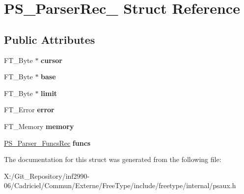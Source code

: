 \hypertarget{struct_p_s___parser_rec__}{\section{P\-S\-\_\-\-Parser\-Rec\-\_\- Struct Reference}
\label{struct_p_s___parser_rec__}
}
\subsection*{Public Attributes}
\begin{DoxyCompactItemize}
\item 
\hypertarget{struct_p_s___parser_rec___a6ed189bc25c03814bdafad63819ddfe7}{F\-T\-\_\-\-Byte $\ast$ {\bfseries cursor}}\label{struct_p_s___parser_rec___a6ed189bc25c03814bdafad63819ddfe7}

\item 
\hypertarget{struct_p_s___parser_rec___a30528f6a9caffce2fd44ef2d5a38e5bd}{F\-T\-\_\-\-Byte $\ast$ {\bfseries base}}\label{struct_p_s___parser_rec___a30528f6a9caffce2fd44ef2d5a38e5bd}

\item 
\hypertarget{struct_p_s___parser_rec___af3310795fd73530036fb32ec4385ea3d}{F\-T\-\_\-\-Byte $\ast$ {\bfseries limit}}\label{struct_p_s___parser_rec___af3310795fd73530036fb32ec4385ea3d}

\item 
\hypertarget{struct_p_s___parser_rec___a7a1432cb4d8bb603663f1258224c8ec4}{F\-T\-\_\-\-Error {\bfseries error}}\label{struct_p_s___parser_rec___a7a1432cb4d8bb603663f1258224c8ec4}

\item 
\hypertarget{struct_p_s___parser_rec___a3e2206deb6c0d73f51c8c71d5db1db1f}{F\-T\-\_\-\-Memory {\bfseries memory}}\label{struct_p_s___parser_rec___a3e2206deb6c0d73f51c8c71d5db1db1f}

\item 
\hypertarget{struct_p_s___parser_rec___a450031fd9e77e55bf424dc64a8d2659d}{\hyperlink{struct_p_s___parser___funcs_rec__}{P\-S\-\_\-\-Parser\-\_\-\-Funcs\-Rec} {\bfseries funcs}}\label{struct_p_s___parser_rec___a450031fd9e77e55bf424dc64a8d2659d}

\end{DoxyCompactItemize}


The documentation for this struct was generated from the following file\-:\begin{DoxyCompactItemize}
\item 
X\-:/\-Git\-\_\-\-Repository/inf2990-\/06/\-Cadriciel/\-Commun/\-Externe/\-Free\-Type/include/freetype/internal/psaux.\-h\end{DoxyCompactItemize}
